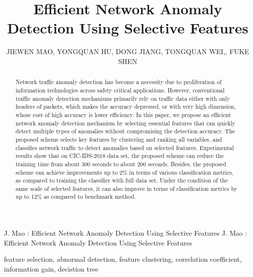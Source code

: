 \documentclass{ieeeaccess}
\theoremstyle{definition}
\begin{document}

\title{Efficient Network Anomaly Detection Using Selective Features}
\author{
    \uppercase{Jiewen Mao},
    \uppercase{Yongquan Hu},
    \uppercase{Dong Jiang},
    \uppercase{Tongquan Wei},, \uppercase{Fuke Shen}}
\address{School of Computer Science and Technology, East China Normal University, Shanghai 200062, China}

\markboth
{J. Mao \headeretal: Efficient Network Anomaly Detection Using Selective Features}
{J. Mao \headeretal: Efficient Network Anomaly Detection Using Selective Features}


\begin{abstract}
    Network traffic anomaly detection has become a necessity due to proliferation of information technologies across safety critical applications. 
    However, conventional traffic anomaly detection mechanisms primarily rely on traffic data either with only headers of packets, which makes the accuracy depressed, or with very high dimension, whose cost of high accuracy is lower efficiency. 
    In this paper, we propose an efficient network anomaly detection mechanism by selecting essential features that can quickly detect multiple types of anomalies without compromising the detection accuracy.
    The proposed scheme selects key features by clustering and ranking all variables, and classifies network traffic to detect anomalies based on selected features.
    Experimental results show that on CIC-IDS-2018 data set, the proposed scheme can reduce the training time from about 300 seconds to about 200 seconds. Besides, the proposed scheme can achieve improvements up to 2\% in terms of various classification metrics, as compared to training the classifier with full data set. 
    Under the condition of the same scale of selected features, it can also improve in terms of classification metrics by up to 12\% as compared to benchmark method.
\end{abstract}

\begin{keywords}
    feature selection, abnormal detection, feature clustering, correlation coefficient, information gain, decistion tree
\end{keywords}

\titlepgskip=-15pt
\end{document}
